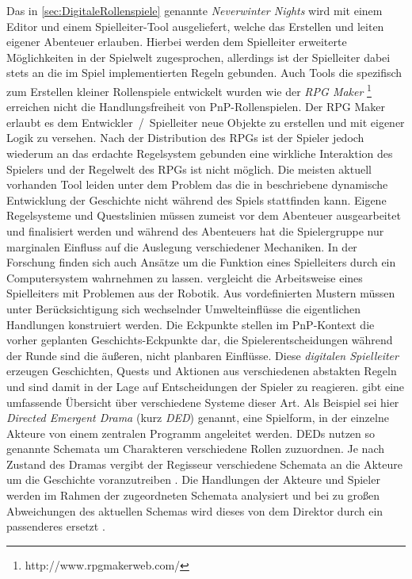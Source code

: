 Das in \ref{sec:DigitaleRollenspiele} genannte \emph{Neverwinter Nights} wird mit einem Editor und einem Spielleiter-Tool ausgeliefert, welche das Erstellen und leiten eigener Abenteuer erlauben. Hierbei werden dem Spielleiter erweiterte Möglichkeiten in der Spielwelt zugesprochen, allerdings ist der Spielleiter dabei stets an die im Spiel implementierten Regeln gebunden. \cite{Tychsen2006a}\newline
Auch Tools die spezifisch zum Erstellen kleiner Rollenspiele entwickelt wurden wie der \emph{RPG Maker} \footnote{http://www.rpgmakerweb.com/} erreichen nicht die Handlungsfreiheit von PnP-Rollenspielen. Der RPG Maker erlaubt es dem Entwickler~/~Spielleiter neue Objekte zu erstellen und mit eigener Logik zu versehen. Nach der Distribution des RPGs ist der Spieler jedoch wiederum an das erdachte Regelsystem gebunden eine wirkliche Interaktion des Spielers und der Regelwelt des RPGs ist nicht möglich.\newline
Die meisten aktuell vorhanden Tool leiden unter dem Problem das die in \cite{Arinbjarnar} beschriebene dynamische Entwicklung der Geschichte nicht während des Spiels stattfinden kann. Eigene Regelsysteme und Questslinien müssen zumeist vor dem Abenteuer ausgearbeitet und finalisiert werden und während des Abenteuers hat die Spielergruppe nur marginalen Einfluss auf die Auslegung verschiedener Mechaniken.\newline
In der Forschung finden sich auch Ansätze um die Funktion eines Spielleiters durch ein Computersystem wahrnehmen zu lassen. \cite{Aylett2007} vergleicht die Arbeitsweise eines Spielleiters mit Problemen aus der Robotik. Aus vordefinierten Mustern müssen unter Berücksichtigung sich wechselnder Umwelteinflüsse die eigentlichen Handlungen konstruiert werden. Die Eckpunkte stellen im PnP-Kontext die vorher geplanten Geschichts-Eckpunkte dar, die Spielerentscheidungen während der Runde sind die äußeren, nicht planbaren Einflüsse.\newline
Diese \emph{digitalen Spielleiter} erzeugen Geschichten, Quests und Aktionen aus verschiedenen abstakten Regeln und sind damit in der Lage auf Entscheidungen der Spieler zu reagieren. \cite{Arinbjarnarb} gibt eine umfassende Übersicht über verschiedene Systeme dieser Art. Als Beispiel sei hier \emph{Directed Emergent Drama} (kurz \emph{DED}) \cite{Arinbjarnara} genannt, eine Spielform, in der einzelne Akteure von einem zentralen Programm angeleitet werden. DEDs nutzen so genannte Schemata um Charakteren verschiedene Rollen zuzuordnen. Je nach Zustand des Dramas vergibt der Regisseur verschiedene Schemata an die Akteure um die Geschichte voranzutreiben \cite{Arinbjarnarb}. Die Handlungen der Akteure und Spieler werden im Rahmen der zugeordneten Schemata analysiert und bei zu großen Abweichungen des aktuellen Schemas wird dieses von dem Direktor durch ein passenderes ersetzt \cite{Arinbjarnar}.\newline

